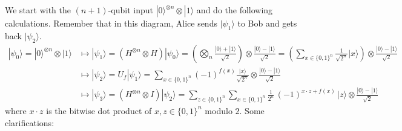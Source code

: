 \documentclass{article}
\theoremstyle{definition}
\begin{document}
We start with the $(n+1)$-qubit input $|0\rangle^{\otimes n} \otimes |1\rangle$ and do the following calculations. Remember that in this diagram, Alice sends $|\psi_1\rangle$ to Bob and gets back $|\psi_2\rangle$. 
\begin{align*} 
  |\psi_0 \rangle = |0\rangle^{\otimes n} \otimes |1\rangle & \longmapsto |\psi_1 \rangle = (H^{\otimes n} \otimes H) |\psi_0 \rangle = \left( \bigotimes_{n} \frac{|0\rangle + |1\rangle}{\sqrt{2}} \right) \otimes \frac{|0\rangle - |1\rangle}{\sqrt{2}} = \left( \sum_{x \in \{0, 1\}^n} \frac{1}{\sqrt{2^n}} |x\rangle \right) \otimes \frac{|0\rangle - |1\rangle}{\sqrt{2}} \\
  & \longmapsto |\psi_2 \rangle = U_f |\psi_1\rangle = \sum_{x \in \{0,1\}^n} (-1)^{f(x)} \frac{|x\rangle}{\sqrt{2^n}} \otimes \frac{|0\rangle - |1\rangle}{\sqrt{2}} \\
  & \longmapsto |\psi_3 \rangle = (H^{\otimes n} \otimes I) |\psi_2 \rangle = \sum_{z \in \{0, 1\}^n} \sum_{x \in \{0, 1\}^n} \frac{1}{2^n}\, (-1)^{x \cdot z + f(x)} \,|z\rangle \otimes \frac{|0\rangle - |1\rangle}{\sqrt{2}} 
\end{align*}
where $x \cdot z$ is the bitwise dot product of $x, z \in \{0, 1\}^n$ modulo $2$. Some clarifications:
\end{document}
